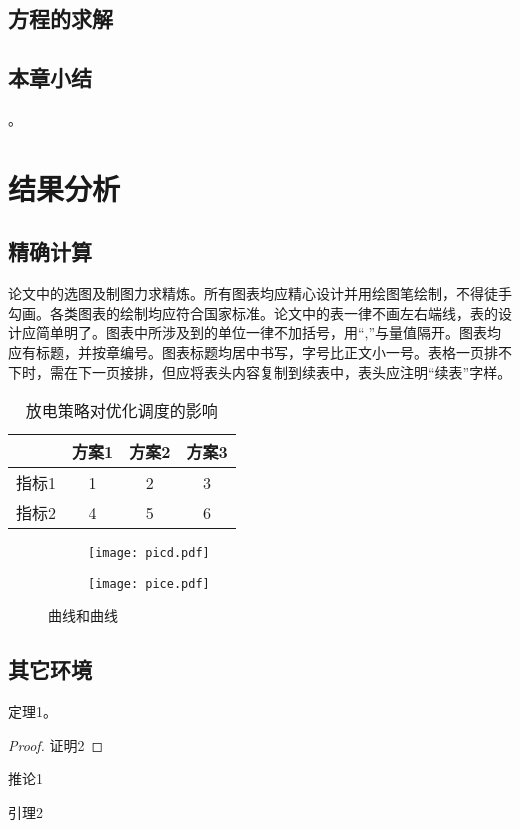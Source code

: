 \documentclass[bachelor]{NCEPU-thesis}
\begin{document}
\section{方程的求解}

\section{本章小结}
。
\chapter{结果分析}

\section{精确计算}
论文中的选图及制图力求精炼。所有图表均应精心设计并用绘图笔绘制，不得徒手勾画。各类图表的绘制均应符合国家标准。论文中的表一律不画左右端线，表的设计应简单明了。图表中所涉及到的单位一律不加括号，用“,”与量值隔开。图表均应有标题，并按章编号。图表标题均居中书写，字号比正文小一号。表格一页排不下时，需在下一页接排，但应将表头内容复制到续表中，表头应注明“续表”字样。

\begin{table}[h]
\caption{放电策略对优化调度的影响}
\begin{tabular}{cccc}
    \toprule
          & 方案1   & 方案2   & 方案3 \\
    \midrule
    指标1   & 1     & 2     & 3 \\
    指标2   & 4     & 5     & 6 \\
    \bottomrule
    \end{tabular}%
\label{tablea}
\end{table}

\begin{figure}[h]
\begin{subfigure}[b]{0.49\linewidth}
\texttt{[image: picd.pdf]}
\label{picd}
\end{subfigure}
\begin{subfigure}[b]{0.49\linewidth}
\texttt{[image: pice.pdf]}
\label{pice}
\end{subfigure}
\caption{曲线和曲线}
\label{fig2}
\end{figure}

\section{其它环境}
\begin{theorem}
定理1。
\end{theorem}
\begin{proof}
证明2
\end{proof}
\begin{corollary}
推论1
\end{corollary}
\begin{lemma}
引理2
\end{lemma}
\end{document}
